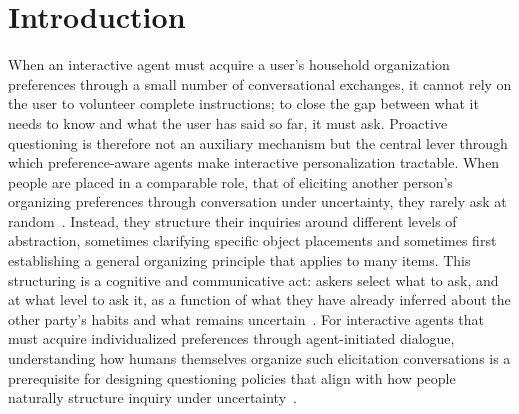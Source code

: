 \documentclass[manuscript,review,anonymous]{acmart}
\begin{document}

\maketitle

\section{Introduction}

When an interactive agent must acquire a user's household organization preferences through a small number of conversational exchanges, it cannot rely on the user to volunteer complete instructions; to close the gap between what it needs to know and what the user has said so far, it must ask. Proactive questioning is therefore not an auxiliary mechanism but the central lever through which preference-aware agents make interactive personalization tractable. When people are placed in a comparable role, that of eliciting another person's organizing preferences through conversation under uncertainty, they rarely ask at random~\cite{stivers2010overview,robinson2023probing}. Instead, they structure their inquiries around different levels of abstraction, sometimes clarifying specific object placements and sometimes first establishing a general organizing principle that applies to many items. This structuring is a cognitive and communicative act: askers select what to ask, and at what level to ask it, as a function of what they have already inferred about the other party's habits and what remains uncertain~\cite{zheng2019personalized,lawley2024val}. For interactive agents that must acquire individualized preferences through agent-initiated dialogue, understanding how humans themselves organize such elicitation conversations is a prerequisite for designing questioning policies that align with how people naturally structure inquiry under uncertainty~\cite{wu2023tidybot,cakmak2012designing,biyik2019asking,6padmakumar2022teach,8leusmann2025investigating}.
\end{document}
